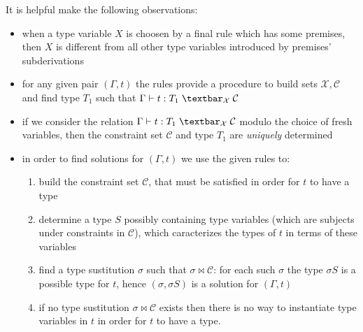 \documentclass[8pt]{beamer}
\begin{document}
\begin{frame}
    It is helpful make the following observations:
    \begin{itemize}
        \item when a type variable $X$ is choosen by a final rule which has
            some premises, then $X$ is different from all other type variables
            introduced by premises' subderivations
        \item for any given pair $(\Gamma, t)$ the rules provide a procedure to 
            build sets $\mathcal{X}, \mathcal{C}$ and find type $T_1$ such that
            $\Gamma \vdash t : T_1 \; \textbar_\mathcal{X} \; \mathcal{C}$
        \item if we consider the relation  
            $\Gamma \vdash t : T_1 \; \textbar_\mathcal{X} \; \mathcal{C}$ modulo
            the choice of fresh variables, then the constraint set $\mathcal{C}$ and
            type $T_1$ are \emph{uniquely} determined
        \item in order to find solutions for $(\Gamma, t)$ we use the given rules to:
            \begin{enumerate}
                \item build the constraint set $\mathcal{C}$, that
                    must be satisfied in order for $t$ to have a type
                \item determine a type $S$ possibly containing type variables (which are 
                    subjects under constraints in $\mathcal{C}$), which caracterizes
                    the types of $t$ in terms of these variables
                \item find a type sustitution $\sigma$ such that $\sigma \Join 
                    \mathcal{C}$: for each such $\sigma$ the type $\sigma S$ is
                    a possible type for $t$, hence $(\sigma, \sigma S)$ 
                    is a solution for $(\Gamma, t)$
                \item if no type sustitution $\sigma \Join \mathcal{C}$ exists then
                    there is no way to instantiate type variables in $t$ in order
                    for $t$ to have a type.
            \end{enumerate}
    \end{itemize}
\end{frame}
\end{document}
